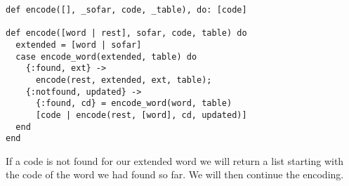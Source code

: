 \documentclass[a4paper,11pt]{article}
\begin{document}
\begin{verbatim}
def encode([], _sofar, code, _table), do: [code]

def encode([word | rest], sofar, code, table) do
  extended = [word | sofar]
  case encode_word(extended, table) do
    {:found, ext} ->
      encode(rest, extended, ext, table);
    {:notfound, updated} ->
      {:found, cd} = encode_word(word, table)
      [code | encode(rest, [word], cd, updated)]
  end
end
\end{verbatim}

If a code is not found for our extended word we will return a list
starting with the code of the word we had found so far. We will then continue the encoding.
\end{document}
